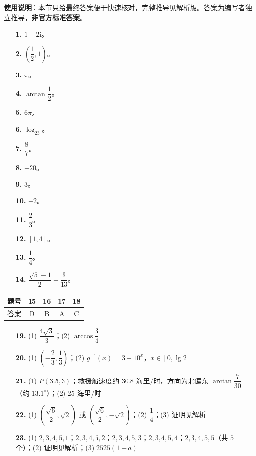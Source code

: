 
\begin{gknotice}
\textbf{使用说明}：本节只给最终答案便于快速核对，完整推导见解析版。答案为编写者独立推导，\textbf{非官方标准答案}。
\end{gknotice}

\begin{itemize}[leftmargin=2.6em]
  \item[\textbf{1.}] $1-2\mathrm i$。
  \item[\textbf{2.}] $\left(\dfrac12,1\right)$。
  \item[\textbf{3.}] $\pi$。
  \item[\textbf{4.}] $\arctan\dfrac12$。
  \item[\textbf{5.}] $6\pi$。
  \item[\textbf{6.}] $\log_23$。
  \item[\textbf{7.}] $\dfrac87$。
  \item[\textbf{8.}] $-20$。
  \item[\textbf{9.}] $3$。
  \item[\textbf{10.}] $-2$。
  \item[\textbf{11.}] $\dfrac23$。
  \item[\textbf{12.}] $[1,4]$。
  \item[\textbf{13.}] $\dfrac14$。
  \item[\textbf{14.}] $\dfrac{\sqrt5-1}2+\dfrac8{13}$。
\end{itemize}

\begin{center}\begin{tabular}{ccccc}
\toprule
题号 & 15 & 16 & 17 & 18 \\
\midrule
答案 & D & B & A & C \\
\bottomrule
\end{tabular}\end{center}

\begin{itemize}[leftmargin=2.6em]
  \item[\textbf{19.}] (1) $\dfrac{4\sqrt3}3$；(2) $\arccos\dfrac34$
  \item[\textbf{20.}] (1) $\left(-\dfrac23,\dfrac13\right)$；(2) $g^{-1}(x)=3-10^x$，$x\in[0,\lg2]$
  \item[\textbf{21.}] (1) $P(3.5,3)$；救援船速度约 $30.8$ 海里/时，方向为北偏东 $\arctan\dfrac7{30}$（约 $13.1^\circ$）；(2) $25$ 海里/时
  \item[\textbf{22.}] (1) $\left(\dfrac{\sqrt6}2,\sqrt2\right)$ 或 $\left(\dfrac{\sqrt6}2,-\sqrt2\right)$；(2) $\dfrac14$；(3) 证明见解析
  \item[\textbf{23.}] (1) $2,3,4,5,1$；$2,3,4,5,2$；$2,3,4,5,3$；$2,3,4,5,4$；$2,3,4,5,5$（共 $5$ 个）；(2) 证明见解析；(3) $2525(1-a)$
\end{itemize}
